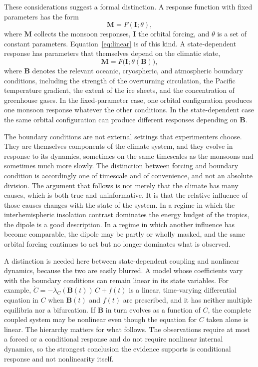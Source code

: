 \documentclass[11pt]{article}
\theoremstyle{definition}
\newcommand{\bB}{\mathbf{B}}
\newcommand{\bM}{\mathbf{M}}
\newcommand{\bI}{\mathbf{I}}
\begin{document}
These considerations suggest a formal distinction. A response function with fixed parameters has the form
\begin{equation}
\bM = F(\bI;\theta),
\label{eq:fixed}
\end{equation}
where $\bM$ collects the monsoon responses, $\bI$ the orbital forcing, and $\theta$ is a set of constant parameters. Equation~\eqref{eq:linear} is of this kind. A state-dependent response has parameters that themselves depend on the climatic state,
\begin{equation}
\bM = F\bigl(\bI;\theta(\bB)\bigr),
\label{eq:state}
\end{equation}
where $\bB$ denotes the relevant oceanic, cryospheric, and atmospheric boundary conditions, including the strength of the overturning circulation, the Pacific temperature gradient, the extent of the ice sheets, and the concentration of greenhouse gases. In the fixed-parameter case, one orbital configuration produces one monsoon response whatever the other conditions. In the state-dependent case the same orbital configuration can produce different responses depending on $\bB$.

The boundary conditions are not external settings that experimenters choose. They are themselves components of the climate system, and they evolve in response to its dynamics, sometimes on the same timescales as the monsoons and sometimes much more slowly. The distinction between forcing and boundary condition is accordingly one of timescale and of convenience, and not an absolute division. The argument that follows is not merely that the climate has many causes, which is both true and uninformative. It is that the relative influence of those causes changes with the state of the system. In a regime in which the interhemispheric insolation contrast dominates the energy budget of the tropics, the dipole is a good description. In a regime in which another influence has become comparable, the dipole may be partly or wholly masked, and the same orbital forcing continues to act but no longer dominates what is observed.

A distinction is needed here between state-dependent coupling and nonlinear dynamics, because the two are easily blurred. A model whose coefficients vary with the boundary conditions can remain linear in its state variables. For example, $\dot C = -\lambda_C(\bB(t))\,C + f(t)$ is a linear, time-varying differential equation in $C$ when $\bB(t)$ and $f(t)$ are prescribed, and it has neither multiple equilibria nor a bifurcation. If $\bB$ in turn evolves as a function of $C$, the complete coupled system may be nonlinear even though the equation for $C$ taken alone is linear. The hierarchy matters for what follows. The observations require at most a forced or a conditional response and do not require nonlinear internal dynamics, so the strongest conclusion the evidence supports is conditional response and not nonlinearity itself.
\end{document}
